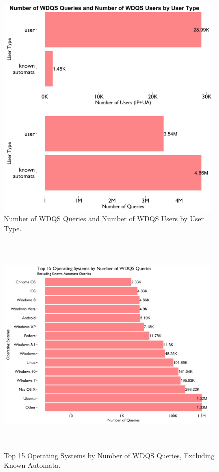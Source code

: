 \documentclass[12pt,]{article}
\begin{document}
\begin{figure}[H]
\centering
\includegraphics[width=11cm,height=11cm,keepaspectratio]{figures/by_agent_type.png}
\caption{Number of WDQS Queries and Number of WDQS Users by User Type.}
\end{figure}

\begin{figure}[H]
\centering
\includegraphics[width=11cm,height=11cm,keepaspectratio]{figures/n_query_by_os.png}
\caption{Top 15 Operating Systems by Number of WDQS Queries, Excluding
Known Automata.}
\end{figure}
\end{document}
